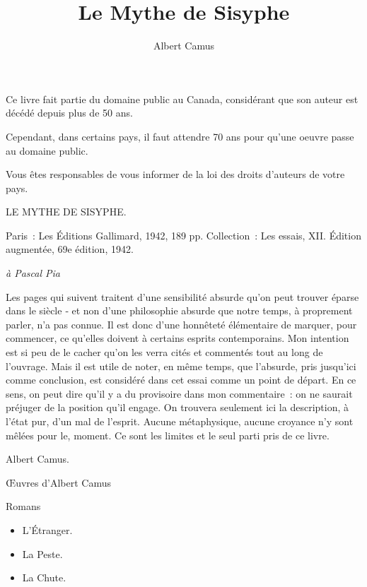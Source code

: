 \documentclass{book}
\author{Albert Camus}
\title{Le Mythe de Sisyphe}
\date{}
\begin{document}
\frontmatter

\maketitle

\pagestyle{empty} %
\begingroup
\footnotesize
\parindent 0pt
\parskip \baselineskip
Ce livre fait partie du domaine public au Canada, considérant que son auteur est décédé depuis plus de 50 ans.

Cependant, dans certains pays, il faut attendre 70 ans pour qu'une oeuvre passe au domaine public.

Vous êtes responsables de vous informer de la loi des droits d'auteurs de votre pays.

LE MYTHE DE SISYPHE.

Paris : Les Éditions Gallimard, 1942, 189 pp. Collection : Les essais, XII. Édition augmentée, 69e édition, 1942.

\newpage %

\emph{à Pascal Pia}

Les pages qui suivent traitent d'une sensibilité absurde qu'on peut trouver éparse dans le siècle ‑ et non d'une philosophie absurde que notre temps, à proprement parler, n'a pas connue. Il est donc d'une honnêteté élémentaire de marquer, pour commencer, ce qu'elles doivent à certains esprits contemporains. Mon intention est si peu de le cacher qu'on les verra cités et commentés tout au long de l'ouvrage.
Mais il est utile de noter, en même temps, que l'absurde, pris jusqu'ici comme conclusion, est considéré dans cet essai comme un point de départ. En ce sens, on peut dire qu'il y a du provisoire dans mon commentaire : on ne saurait préjuger de la position qu'il engage. On trouvera seulement ici la description, à l'état pur, d'un mal de l'esprit. Aucune métaphysique, aucune croyance n'y sont mêlées pour le, moment. Ce sont les limites et le seul parti pris de ce livre.

Albert Camus.

\newpage %

\begin{center}
    \Large{Œuvres d'Albert Camus}
\end{center}

Romans

    \begin{itemize}
        \item L'Étranger.

        \item La Peste.

        \item La Chute.
    \end{itemize}
\end{document}

